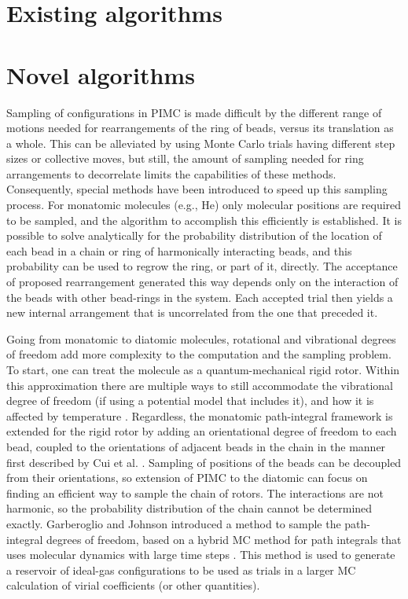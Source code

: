 \section{Existing algorithms}
\section{Novel algorithms}\label{sec:novel algorithms}
        Sampling of configurations in PIMC is made difficult by the different range of motions needed for rearrangements of the ring of beads, versus its translation as a whole. This can be alleviated by using Monte Carlo trials having different step sizes or collective moves, but still, the amount of sampling needed for ring arrangements to decorrelate limits the capabilities of these methods. Consequently, special methods have been introduced to speed up this sampling process. For monatomic molecules (e.g., He) only molecular positions are required to be sampled, and the algorithm \cite{Fosdick:1966vh,Patkowski2008,Shaul2012} to accomplish this efficiently is established. It is possible to solve analytically for the probability distribution of the location of each bead in a chain or ring of harmonically interacting beads, and this probability can be used to regrow the ring, or part of it, directly. The acceptance of proposed rearrangement generated this way depends only on the interaction of the beads with other bead-rings in the system. Each accepted trial then yields a new internal arrangement that is uncorrelated from the one that preceded it.

        Going from monatomic to diatomic molecules, rotational and vibrational degrees of freedom add more complexity to the computation and the sampling problem. To start, one can treat the molecule as a quantum-mechanical rigid rotor. Within this approximation there are multiple ways to still accommodate the vibrational degree of freedom (if using a potential model that includes it), and how it is affected by temperature \cite{Garberoglio2012,Garberoglio2014}. Regardless, the monatomic path-integral framework is extended for the rigid rotor by adding an orientational degree of freedom to each bead, coupled to the orientations of adjacent beads in the chain in the manner first described by Cui et al. \cite{Cui1997}. Sampling of positions of the beads can be decoupled from their orientations, so extension of PIMC to the diatomic can focus on finding an efficient way to sample the chain of rotors.  The interactions are not harmonic, so the probability distribution of the chain cannot be determined exactly. Garberoglio and Johnson \cite{Garberoglio2010} introduced a method to sample the path-integral degrees of freedom, based on a hybrid MC method for path integrals that uses molecular dynamics with large time steps \cite{Tuckerman:1993hu}.  This method is used to generate a reservoir of ideal-gas configurations to be used as trials in a larger MC calculation of virial coefficients (or other quantities).


